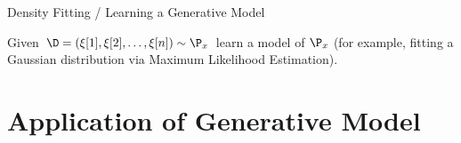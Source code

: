 \begin{frame}{Density Fitting / Learning a Generative Model}


Given  $\D = \left(\xi[1], \xi[2],\dots, \xi[n] \right) \sim \P_x$ learn a model of $\P_x$ (for example, fitting a Gaussian distribution via Maximum Likelihood Estimation). 

\pause
{}

\end{frame}

\section{Application of Generative Model}

